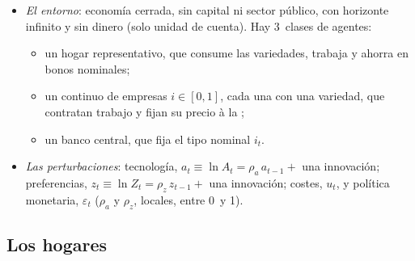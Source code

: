 \documentclass[11pt]{article}
\begin{document}
\begin{itemize}
\item \emph{El entorno}: economía cerrada, sin capital ni sector público, con horizonte infinito y sin dinero (solo unidad de cuenta). Hay 3~clases de agentes:
  \begin{itemize}
  \item un hogar representativo, que consume las variedades, trabaja y ahorra en bonos nominales;
  \item un continuo de empresas $i\in[0,1]$, cada una con una variedad, que contratan trabajo y fijan su precio à la ;
  \item un banco central, que fija el tipo nominal $i_t$.
  \end{itemize}
\item \emph{Las perturbaciones}: tecnología, $a_t\equiv\ln A_t=\rho_a\,a_{t-1}+$ una innovación; preferencias, $z_t\equiv\ln Z_t=\rho_z\,z_{t-1}+$ una innovación; costes, $u_t$, y política monetaria, $\varepsilon_t$ ($\rho_a$ y $\rho_z$, locales, entre 0~y 1).
\end{itemize}

\subsection{Los hogares}\label{anexo:hogares}
\end{document}
